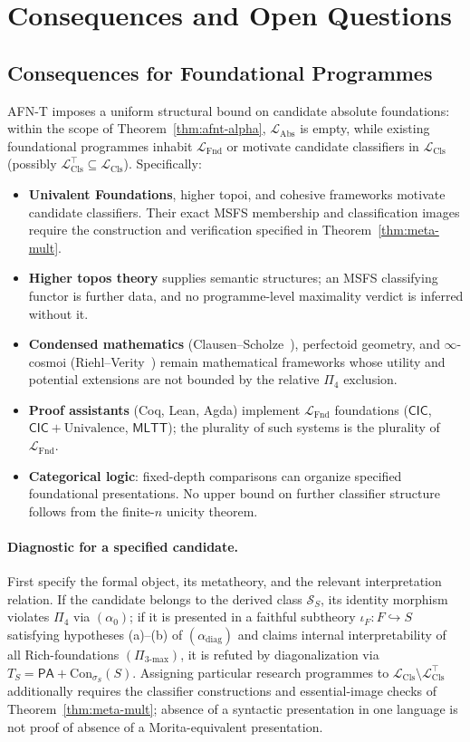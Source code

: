 \documentclass[11pt]{article}
\theoremstyle{plain}
\theoremstyle{definition}
\newcommand{\cS}{\mathcal{S}}
\newcommand{\LFnd}{\mathcal{L}_{\mathrm{Fnd}}}
\newcommand{\LCls}{\mathcal{L}_{\mathrm{Cls}}}
\newcommand{\LClsMax}{\mathcal{L}_{\mathrm{Cls}}^{\top}}
\newcommand{\LAbs}{\mathcal{L}_{\mathrm{Abs}}}
\newcommand{\Con}{\mathrm{Con}}
\newcommand{\PA}{\mathsf{PA}}
\newcommand{\MLTT}{\mathsf{MLTT}}
\newcommand{\CIC}{\mathsf{CIC}}
\begin{document}
\section{Consequences and Open Questions}\label{sec:consequences}

\subsection{Consequences for Foundational Programmes}

AFN-T imposes a uniform structural bound on candidate absolute foundations: within the scope of Theorem~\ref{thm:afnt-alpha}, $\LAbs$ is empty, while existing foundational programmes inhabit $\LFnd$ or motivate candidate classifiers in $\LCls$ (possibly $\LClsMax \subseteq \LCls$). Specifically:
\begin{itemize}\setlength{\itemsep}{1pt}
\item \textbf{Univalent Foundations}, higher topoi, and cohesive frameworks motivate candidate classifiers. Their exact MSFS membership and classification images require the construction and verification specified in Theorem~\ref{thm:meta-mult}.
\item \textbf{Higher topos theory} supplies semantic structures; an MSFS classifying functor is further data, and no programme-level maximality verdict is inferred without it.
\item \textbf{Condensed mathematics} (Clausen--Scholze~\cite{ClausenScholze2019}), perfectoid geometry, and $\infty$-cosmoi (Riehl--Verity~\cite{RiehlVerity2022}) remain mathematical frameworks whose utility and potential extensions are not bounded by the relative $\Pi_4$ exclusion.
\item \textbf{Proof assistants} (Coq, Lean, Agda) implement $\LFnd$ foundations ($\CIC$, $\CIC + \mathrm{Univalence}$, $\MLTT$); the plurality of such systems is the plurality of $\LFnd$.
\item \textbf{Categorical logic}: fixed-depth comparisons can organize specified foundational presentations. No upper bound on further classifier structure follows from the finite-$n$ unicity theorem.
\end{itemize}

\paragraph{Diagnostic for a specified candidate.} First specify the formal object, its metatheory, and the relevant interpretation relation. If the candidate belongs to the derived class $\cS_S$, its identity morphism violates $\Pi_4$ via $(\alpha_0)$; if it is presented in a faithful subtheory $\iota_F : F \hookrightarrow S$ satisfying hypotheses (a)--(b) of $(\alpha_{\mathrm{diag}})$ and claims internal interpretability of all Rich-foundations $(\Pi_{3\text{-max}})$, it is refuted by diagonalization via $T_S = \PA + \Con_{\sigma_S}(S)$. Assigning particular research programmes to $\LCls\setminus\LClsMax$ additionally requires the classifier constructions and essential-image checks of Theorem~\ref{thm:meta-mult}; absence of a syntactic presentation in one language is not proof of absence of a Morita-equivalent presentation.
\end{document}
